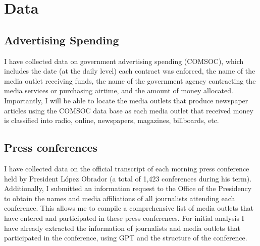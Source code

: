 \section{Data}
\label{sec:data}

\subsection{Advertising Spending}

I have collected data on government advertising spending (COMSOC), which includes the date (at the daily level) each contract was enforced, the name of the media outlet receiving funds, the name of the government agency contracting the media services or purchasing airtime, and the amount of money allocated. Importantly, I will be able to locate the media outlets that produce newspaper articles using the COMSOC data base as each media outlet that received money is classified into radio, online, newspapers, magazines, billboards, etc. 

\subsection{Press conferences}

I have collected data on the official transcript of each morning press conference held by President López Obrador (a total of 1,423 conferences during his term). Additionally, I submitted an information request to the Office of the Presidency to obtain the names and media affiliations of all journalists attending each conference. This allows me to compile a comprehensive list of media outlets that have entered and participated in these press conferences. For initial analysis I have already extracted the information of journalists and media outlets that participated in the conference, using GPT and the structure of the conference. 


